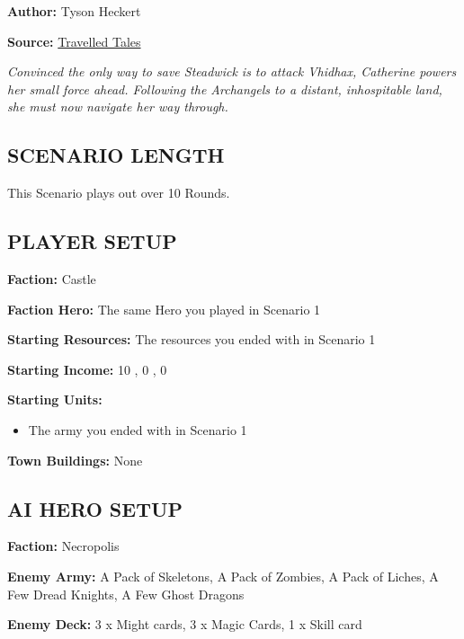 
\begin{multicols*}{2}

\textbf{Author:} Tyson Heckert

\textbf{Source:} \href{https://travelledtales.com}{Travelled Tales}

\textit{Convinced the only way to save Steadwick is to attack Vhidhax, Catherine powers her small force ahead. 
Following the Archangels to a distant, inhospitable land, she must now navigate her way through.}

\subsection*{\MakeUppercase{Scenario length}}

This Scenario plays out over 10 Rounds.

\subsection*{\MakeUppercase{Player setup}}

\textbf{Faction:} Castle

\textbf{Faction Hero:} The same Hero you played in Scenario 1

\textbf{Starting Resources:} The resources you ended with in Scenario 1

\textbf{Starting Income:} 10 , 0 , 0 

\textbf{Starting Units:}
\begin{itemize}
  \item The army you ended with in Scenario 1
\end{itemize}

\textbf{Town Buildings:} None

\subsection*{\MakeUppercase{AI Hero setup}}

\textbf{Faction:} Necropolis

\textbf{Enemy Army:} A Pack of Skeletons, A Pack of Zombies, A Pack of Liches, A Few Dread Knights, A Few Ghost Dragons

\textbf{Enemy Deck:} 3 x Might cards, 3 x Magic Cards, 1 x Skill card


\end{multicols*}
